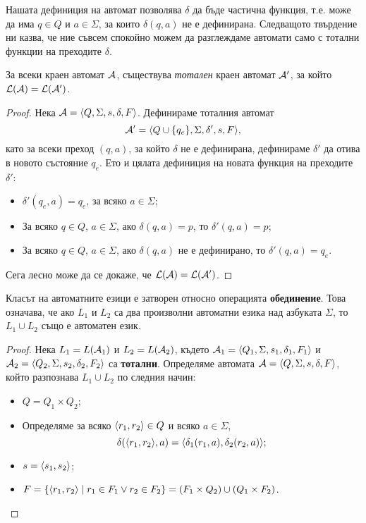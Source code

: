 Нашата дефиниция на автомат позволява $\delta$ да бъде частична функция, т.е.
може да има $q\in Q$ и $a\in\Sigma$, за които $\delta(q,a)$ не е дефинирана.
Следващото твърдение ни казва, че ние съвсем спокойно можем да разглеждаме автомати
само с тотални функции на преходите  $\delta$.
\begin{prop}
  За всеки краен автомат $\mathcal{A}$, съществува {\em тотален} краен автомат $\mathcal{A}'$,
  за който $\mathcal{L}(\mathcal{A}) = \mathcal{L}(\mathcal{A}')$.
\end{prop}
\begin{proof}
  Нека $\mathcal{A} = \langle{Q,\Sigma,s,\delta,F}\rangle$.
  Дефинираме тоталния автомат 
  \[\mathcal{A}' = \langle{Q\cup\{q_e\}, \Sigma, \delta', s, F}\rangle,\]
  като за всеки преход $(q,a)$, за който $\delta$ не е дефинирана, 
  дефинираме $\delta'$ да отива в новото състояние $q_e$.
  Ето и цялата дефиниция на новата функция на преходите $\delta'$:
  \begin{itemize}
  \item 
    $\delta'(q_e,a) = q_e$, за всяко $a\in\Sigma$;
  \item
    За всяко $q\in Q$, $a\in\Sigma$, ако $\delta(q,a) = p$, то
    $\delta'(q,a) = p$;
  \item
    За всяко $q\in Q$, $a\in\Sigma$, ако $\delta(q,a)$ не е дефинирано, то
    $\delta'(q,a) = q_e$.
  \end{itemize}
  Сега лесно може да се докаже, че $\mathcal{L}(\mathcal{A}) = \mathcal{L}(\mathcal{A}')$.
\end{proof}

\begin{prop}
  \label{pr:automata-union}
  Класът на автоматните езици е затворен относно операцията {\bf обединение}.
  Това означава, че ако $L_1$ и $L_2$ са два произволни автоматни езика над азбуката $\Sigma$, то $L_1\cup L_2$
  също е автоматен език.
\end{prop}
\begin{proof}
  Нека $L_1 = L(\mathcal{A}_1)$ и $L_2 = L(\mathcal{A}_2)$, 
  където $\mathcal{A}_1 = \langle{Q_1,\Sigma,s_1,\delta_1,F_1}\rangle$ и $\mathcal{A}_2 = \langle{Q_2,\Sigma,s_2,\delta_2,F_2}\rangle$ са {\bf тотални}.
  Определяме автомата $\mathcal{A} = \langle{Q,\Sigma,s,\delta,F}\rangle$, който разпознава $L_1\cup L_2$ по следния начин:
  \begin{itemize}
  \item
    $Q = Q_1\times Q_2$;
  \item
    Определяме за всяко $\langle{r_1,r_2}\rangle \in Q$ и всяко $a \in \Sigma$,
    \[\delta(\langle{r_1,r_2}\rangle,a) = \langle{\delta_1(r_1,a),\delta_2(r_2,a)}\rangle;\]
  \item
    $s = \langle{s_1,s_2}\rangle$;
  \item
    $F = \{\langle{r_1,r_2}\rangle\mid r_1\in F_1\vee r_2 \in F_2\} = (F_1\times Q_2)\cup (Q_1\times F_2)$.
  \end{itemize}
\end{proof}

